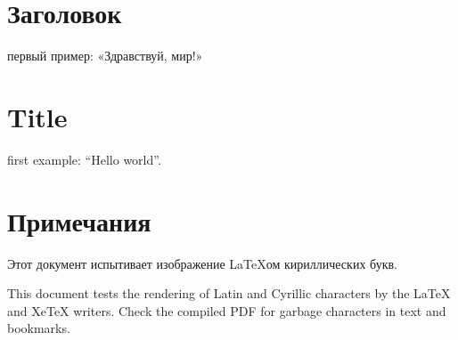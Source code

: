 \documentclass[a4paper,russian]{article}
\begin{document}
\section{Заголовок%
  \label{section-1}%
}

первый пример: «Здравствуй, мир!»


\section{Title%
  \label{title}%
}

\foreignlanguage{english}{first example: “Hello world”.}


\section{Примечания%
  \label{section-2}%
}

Этот документ испытивает изображение LaTeXом кириллических букв.

\foreignlanguage{english}{This document tests the rendering of Latin and Cyrillic characters by the
LaTeX and XeTeX writers. Check the compiled PDF for garbage characters in
text and bookmarks.}
\end{document}
